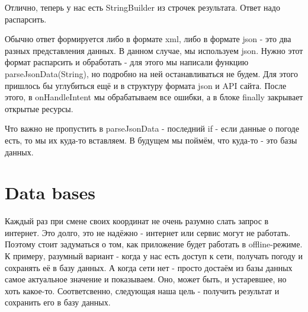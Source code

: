 \documentclass[12 pt]{article}
\begin{document}
    Отлично, теперь у нас есть StringBuilder из строчек результата. Ответ надо распарсить.
    
    Обычно ответ формируется либо в формате xml, либо в формате json - это два разных представления данных. В данном случае, мы используем json. Нужно этот формат распарсить и обработать - для этого мы написали функцию parseJsonData(String), но подробно на ней останавливаться не будем. Для этого пришлось бы углубиться ещё и в структуру формата json и API сайта. После этого, в onHandleIntent мы обрабатываем все ошибки, а в блоке finally закрывает открытые ресурсы.
    
    Что важно не пропустить в parseJsonData - последний if - если данные о погоде есть, то мы их куда-то вставляем. В будущем мы поймём, что куда-то - это базы данных.

\section{Data bases}
    
    Каждый раз при смене своих координат не очень разумно слать запрос в интернет. Это долго, это не надёжно - интернет или сервис могут не работать. Поэтому стоит задуматься о том, как приложение будет работать в offline-режиме. К примеру, разумный вариант - когда у нас есть доступ к сети, получать погоду и сохранять её в базу данных. А когда сети нет - просто достаём из базы данных самое актуальное значение и показываем. Оно, может быть, и устаревшее, но хоть какое-то. Соответсвенно, следующая наша цель - получить результат и сохранить его в базу данных.
    
\end{document}
